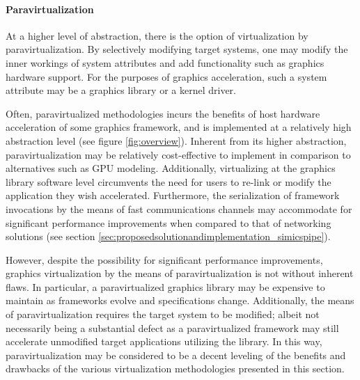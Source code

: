 \paragraph{Paravirtualization}
\label{par:backgroundandrelatedwork_graphicsvirtualization_paravirtualization}
At a higher level of abstraction, there is the option of virtualization by paravirtualization.
By selectively modifying target systems, one may modify the inner workings of system attributes and add functionality such as graphics hardware support.
For the purposes of graphics acceleration, such a system attribute may be a graphics library or a kernel driver.

Often, paravirtualized methodologies incurs the benefits of host hardware acceleration of some graphics framework, and is implemented at a relatively high abstraction level (see figure \ref{fig:overview}).
Inherent from its higher abstraction, paravirtualization may be relatively cost-effective to implement in comparison to alternatives such as GPU modeling.
Additionally, virtualizing at the graphics library software level circumvents the need for users to re-link or modify the application they wish accelerated.
Furthermore, the serialization of framework invocations by the means of fast communications channels may accommodate for significant performance improvements when compared to that of networking solutions (see section \ref{sec:proposedsolutionandimplementation_simicspipe}).

However, despite the possibility for significant performance improvements, graphics virtualization by the means of paravirtualization is not without inherent flaws.
In particular, a paravirtualized graphics library may be expensive to maintain as frameworks evolve and specifications change.
Additionally, the means of paravirtualization requires the target system to be modified; albeit not necessarily being a substantial defect as a paravirtualized framework may still accelerate unmodified target applications utilizing the library.
In this way, paravirtualization may be considered to be a decent leveling of the benefits and drawbacks of the various virtualization methodologies presented in this section.

